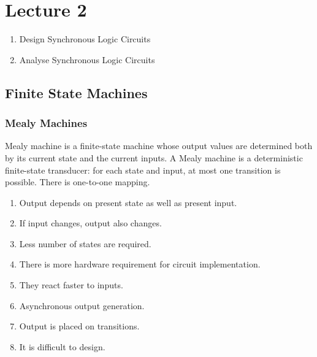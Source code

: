 \documentclass[11pt, a4paper]{article}
\begin{document}
\section{Lecture 2}
\begin{enumerate}
    \item Design Synchronous Logic Circuits
    \item Analyse Synchronous Logic Circuits
\end{enumerate}

\subsection{Finite State Machines}
\subsubsection{Mealy Machines}
Mealy machine is a finite-state machine whose output values are determined both by its current state and the current inputs.\newline
A Mealy machine is a deterministic finite-state transducer: for each state and input, at most one transition is possible. There is one-to-one mapping.
 
 \begin{enumerate}
     \item Output depends on present state as well as present input.
     \item If input changes, output also changes.
     \item Less number of states are required.
     \item  There is more hardware requirement for circuit implementation.
     \item They react faster to inputs.
     \item Asynchronous output generation.
     \item Output is placed on transitions.
     \item It is difficult to design.
 \end{enumerate}
 
\end{document}
